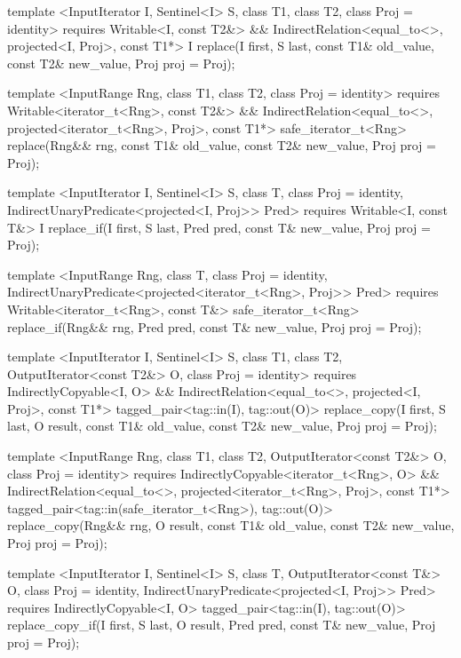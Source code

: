 \begin{codeblock}
{{{{  template <InputIterator I, Sentinel<I> S, class T1, class T2, class Proj = identity>
    requires Writable<I, const T2&> &&
      IndirectRelation<equal_to<>, projected<I, Proj>, const T1*>
    I
      replace(I first, S last, const T1& old_value, const T2& new_value, Proj proj = Proj{});

  template <InputRange Rng, class T1, class T2, class Proj = identity>
    requires Writable<iterator_t<Rng>, const T2&> &&
      IndirectRelation<equal_to<>, projected<iterator_t<Rng>, Proj>, const T1*>
    safe_iterator_t<Rng>
      replace(Rng&& rng, const T1& old_value, const T2& new_value, Proj proj = Proj{});

  template <InputIterator I, Sentinel<I> S, class T, class Proj = identity,
      IndirectUnaryPredicate<projected<I, Proj>> Pred>
    requires Writable<I, const T&>
    I
      replace_if(I first, S last, Pred pred, const T& new_value, Proj proj = Proj{});

  template <InputRange Rng, class T, class Proj = identity,
      IndirectUnaryPredicate<projected<iterator_t<Rng>, Proj>> Pred>
    requires Writable<iterator_t<Rng>, const T&>
    safe_iterator_t<Rng>
      replace_if(Rng&& rng, Pred pred, const T& new_value, Proj proj = Proj{});

  template <InputIterator I, Sentinel<I> S, class T1, class T2, OutputIterator<const T2&> O,
      class Proj = identity>
    requires IndirectlyCopyable<I, O> &&
      IndirectRelation<equal_to<>, projected<I, Proj>, const T1*>
    tagged_pair<tag::in(I), tag::out(O)>
      replace_copy(I first, S last, O result, const T1& old_value, const T2& new_value,
                   Proj proj = Proj{});

  template <InputRange Rng, class T1, class T2, OutputIterator<const T2&> O,
      class Proj = identity>
    requires IndirectlyCopyable<iterator_t<Rng>, O> &&
      IndirectRelation<equal_to<>, projected<iterator_t<Rng>, Proj>, const T1*>
    tagged_pair<tag::in(safe_iterator_t<Rng>), tag::out(O)>
      replace_copy(Rng&& rng, O result, const T1& old_value, const T2& new_value,
                   Proj proj = Proj{});

  template <InputIterator I, Sentinel<I> S, class T, OutputIterator<const T&> O,
      class Proj = identity, IndirectUnaryPredicate<projected<I, Proj>> Pred>
    requires IndirectlyCopyable<I, O>
    tagged_pair<tag::in(I), tag::out(O)>
      replace_copy_if(I first, S last, O result, Pred pred, const T& new_value,
                      Proj proj = Proj{});

}}}}
\end{codeblock}

